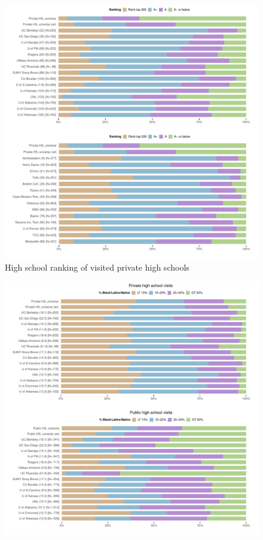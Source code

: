 \documentclass[
  12pt,
]{article}
\begin{document}
\begin{landscape}
\begin{figure}
{\centering \includegraphics[width=2\linewidth]{./ego_network_rank_pubu_privu} 

}

\caption{High school ranking of visited private high schools}\label{fig:rank-pubu-privu}
\end{figure}

\newpage

\begin{figure}

{\centering \includegraphics[width=2\linewidth]{./ego_network_race_pubu_privhs_pubhs} 

}
\end{figure}
\end{landscape}
\end{document}
